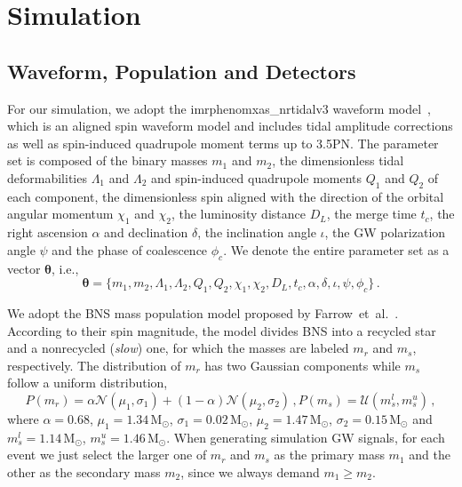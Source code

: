 \documentclass[a4paper,11pt]{article}
\begin{document}
\section{Simulation}
\label{sec:simulation}

\subsection{Waveform, Population and Detectors}
\label{subsec:simulation_preliminaries}

For our simulation, we adopt the {\sc imrphenomxas\_nrtidalv3} waveform model~\cite{Abac:2023ujg}, 
which is an aligned spin waveform model and includes tidal amplitude corrections as well as spin-induced quadrupole moment terms up to 3.5PN. 
The parameter set is composed of the binary masses $m_1$ and $m_2$, the 
dimensionless tidal deformabilities $\Lambda_1$ and $\Lambda_2$ and spin-induced 
quadrupole moments $Q_1$ and $Q_2$ of each component, the dimensionless spin 
aligned with the direction of the orbital angular momentum $\chi_1$ and $\chi_2$, the 
luminosity distance $D_L$, the merge time $t_c$, the right ascension $\alpha$ and 
declination $\delta$, the inclination angle $\iota$, the GW polarization angle 
$\psi$ and the phase of coalescence $\phi_c$. We denote the entire parameter set as a vector $\bm{\theta}$, i.e.,
\begin{equation}
\label{parameter set}
\bm{\theta} = \{m_1,m_2,\Lambda_1,\Lambda_2,Q_1,Q_2,\chi_1,\chi_2,D_L,t_c,\alpha,\delta,\iota,\psi,\phi_c\}\,.
\end{equation}

We adopt the BNS mass population model proposed by Farrow~et~al.~\cite{Farrow:2019xnc}. 
According to their spin magnitude, the model divides BNS into a recycled star and a nonrecycled 
(\emph{slow}) one, for which the masses are labeled $m_r$ and $m_s$, respectively. 
The distribution of $m_r$ has two Gaussian components while $m_s$ follow a uniform distribution,
\begin{subequations}
\label{mass population}
\begin{equation}
    P(m_r) = \alpha \mathcal{N}(\mu_1, \sigma_1) + (1-\alpha) \mathcal{N}(\mu_2, \sigma_2)\,,
\end{equation}
\begin{equation}
    P(m_s) = \mathcal{U}(m_s^l, m_s^u)\,,
\end{equation}
\end{subequations}
where $\alpha=0.68$, $\mu_1=1.34\,\mathrm{M}_{\odot}$, $\sigma_1=0.02\,\mathrm{M}_
{\odot}$, $\mu_2=1.47\,\mathrm{M}_{\odot}$, $\sigma_2=0.15\,\mathrm{M}_{\odot}$ 
and $m_s^l=1.14\,\mathrm{M}_{\odot}$, $m_s^u=1.46\,\mathrm{M}_{\odot}$. When 
generating simulation GW signals, for each event we just select the larger one of 
$m_r$ and $m_s$ as the primary mass $m_1$ and the other as the secondary mass 
$m_2$, since we always demand $m_1 \geq m_2$.
\end{document}
